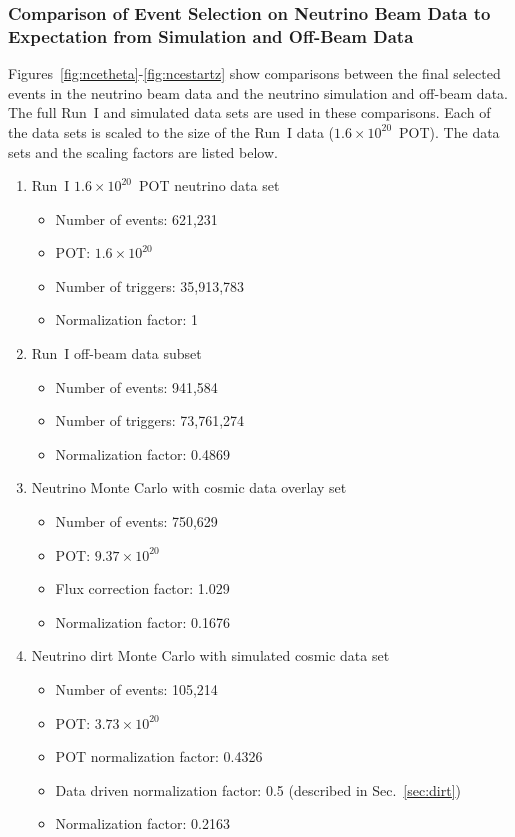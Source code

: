   \subsubsection{Comparison of Event Selection on Neutrino Beam Data to
    Expectation from Simulation and Off-Beam Data}\label{sec:datamcevent}
    Figures~\ref{fig:ncetheta}-\ref{fig:ncestartz} show comparisons between the
    final selected events in the neutrino beam data and the neutrino simulation
    and off-beam data. The full Run~I and simulated data sets are used in these
    comparisons. Each of the data sets is scaled to the size of the Run~I data
    ($1.6\times 10^{20}$~POT). The data sets and the scaling factors are listed below.
    \begin{enumerate}
      \item Run~I $1.6\times 10^{20}$~POT neutrino data set
      \begin{itemize}
        \item Number of events: 621,231
        \item POT: $1.6\times 10^{20}$
        \item Number of triggers: 35,913,783
        \item Normalization factor: 1
      \end{itemize}
      \item Run~I off-beam data subset
      \begin{itemize}
        \item Number of events: 941,584
        \item Number of triggers: 73,761,274
        \item Normalization factor: 0.4869
      \end{itemize}
      \item Neutrino Monte Carlo with cosmic data overlay set
      \begin{itemize}
        \item Number of events: 750,629
        \item POT: $9.37 \times 10^{20}$
        \item Flux correction factor: 1.029
        \item Normalization factor: 0.1676
      \end{itemize}
    \item Neutrino dirt Monte Carlo with simulated cosmic data set
      \begin{itemize}
        \item Number of events: 105,214
        \item POT: $3.73\times 10^{20}$
        \item POT normalization factor: 0.4326
        \item Data driven normalization factor: 0.5 (described in Sec.~\ref{sec:dirt})
        \item Normalization factor: 0.2163
      \end{itemize}
    \end{enumerate}

